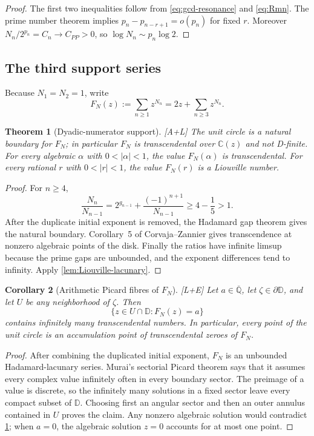 \documentclass[11pt]{article}
\newtheorem{theorem}{Theorem}[section]
\newtheorem{corollary}[theorem]{Corollary}
\theoremstyle{definition}
\theoremstyle{remark}
\newcommand{\status}[1]{\textnormal{\textcolor{accent}{\footnotesize[#1]}}}
\begin{document}
\begin{proof}
The first two inequalities follow from \eqref{eq:gcd-resonance} and
\eqref{eq:Rmn}.  The prime number theorem implies
$p_n-p_{n-r+1}=o(p_n)$ for fixed $r$.  Moreover
$N_n/2^{p_n}=C_n\to C_{PP}>0$, so
$\log N_n\sim p_n\log2$.
\end{proof}

\subsection{The third support series}

Because $N_1=N_2=1$, write
\begin{equation}\label{eq:FN}
 F_N(z):=\sum_{n\ge1}z^{N_n}=2z+\sum_{n\ge3}z^{N_n}.
\end{equation}

\begin{theorem}[Dyadic-numerator support]\label{thm:FN-values}
\status{A+L}
The unit circle is a natural boundary for $F_N$; in particular $F_N$ is transcendental
over $\mathbb C(z)$ and not D-finite.  For every algebraic $\alpha$ with
$0<|\alpha|<1$, the value $F_N(\alpha)$ is transcendental.  For every rational $r$
with $0<|r|<1$, the value $F_N(r)$ is a Liouville number.
\end{theorem}

\begin{proof}
For $n\ge4$,
\[
 \frac{N_n}{N_{n-1}}
 =2^{g_{n-1}}+\frac{(-1)^{n+1}}{N_{n-1}}
 \ge4-\frac15>1.
\]
After the duplicate initial exponent is removed, the Hadamard gap theorem gives the
natural boundary.  Corollary~5 of Corvaja--Zannier \cite{CorvajaZannier} gives
transcendence at nonzero algebraic points of the disk.  Finally the ratios have infinite
limsup because the prime gaps are unbounded, and the exponent differences tend to
infinity.  Apply \cref{lem:Liouville-lacunary}.
\end{proof}

\begin{corollary}[Arithmetic Picard fibres of $F_N$]
\label{cor:FN-arithmetic-Picard}
\status{L+E}
Let $a\in\overline{\mathbb Q}$, let $\zeta\in\partial\mathbb D$, and let $U$ be any
neighborhood of $\zeta$.  Then
\[
 \{z\in U\cap\mathbb D:F_N(z)=a\}
\]
contains infinitely many transcendental numbers.  In particular, every point of the unit
circle is an accumulation point of transcendental zeroes of $F_N$.
\end{corollary}

\begin{proof}
After combining the duplicated initial exponent, $F_N$ is an unbounded
Hadamard-lacunary series.  Murai's sectorial Picard theorem
\cite[Remark~21]{Murai} says that it assumes every complex value infinitely often in
every boundary sector.  The preimage of a value is discrete, so the infinitely many
solutions in a fixed sector leave every compact subset of $\mathbb D$.  Choosing first
an angular sector and then an outer annulus contained in $U$ proves the claim.  Any nonzero
algebraic solution would contradict \cref{thm:FN-values}; when $a=0$, the algebraic
solution $z=0$ accounts for at most one point.
\end{proof}
\end{document}
